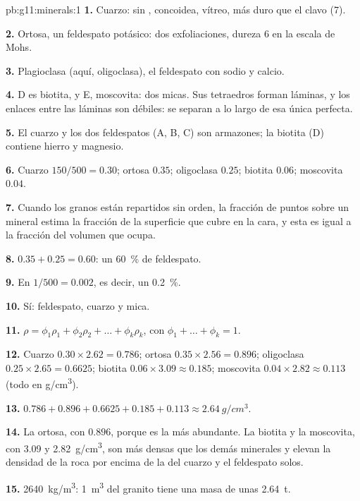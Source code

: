 \begin{solution}{pb:g11:minerals:1}
\textbf{1.} Cuarzo: sin ,  concoidea,  vítreo, más
duro que el clavo (7).

\textbf{2.} Ortosa, un feldespato potásico: dos exfoliaciones, dureza 6 en la
escala de Mohs.

\textbf{3.} Plagioclasa (aquí, oligoclasa), el feldespato con sodio y
calcio.

\textbf{4.} D es biotita, y E, moscovita: dos micas. Sus tetraedros forman
láminas, y los enlaces entre las láminas son débiles: se separan a lo largo de
esa única  perfecta.

\textbf{5.} El cuarzo y los dos feldespatos (A, B, C) son armazones; la
biotita (D) contiene hierro y magnesio.

\textbf{6.} Cuarzo $150/500 = 0.30$; ortosa $0.35$; oligoclasa $0.25$;
biotita $0.06$; moscovita $0.04$.

\textbf{7.} Cuando los granos están repartidos sin orden, la fracción de
puntos sobre un mineral estima la fracción de la superficie que cubre en la
cara, y esta es igual a la fracción del volumen que ocupa.

\textbf{8.} $0.35 + 0.25 = 0.60$: un \qty{60}{\percent} de feldespato.

\textbf{9.} En $1/500 = 0.002$, es decir, un \qty{0.2}{\percent}.

\textbf{10.} Sí: feldespato, cuarzo y mica.

\textbf{11.} $\rho = \phi_1 \rho_1 + \phi_2 \rho_2 + \dots + \phi_k \rho_k$,
con $\phi_1 + \dots + \phi_k = 1$.

\textbf{12.} Cuarzo $0.30 \times 2.62 = 0.786$; ortosa $0.35 \times 2.56 =
0.896$; oligoclasa $0.25 \times 2.65 = 0.6625$; biotita $0.06 \times 3.09
\approx 0.185$; moscovita $0.04 \times 2.82 \approx 0.113$ (todo en
\unit{g/cm^3}).

\textbf{13.} $0.786 + 0.896 + 0.6625 + 0.185 + 0.113 \approx
\qty{2.64}{g/cm^3}$.

\textbf{14.} La ortosa, con $0.896$, porque es la más abundante. La biotita y
la moscovita, con \qty{3.09}{} y \qty{2.82}{g/cm^3}, son más densas que los
demás minerales y elevan la densidad de la roca por encima de la del cuarzo y
el feldespato solos.

\textbf{15.} \qty{2640}{kg/m^3}: \qty{1}{m^3} del granito tiene una masa de
unas \qty{2.64}{t}.


\end{solution}

